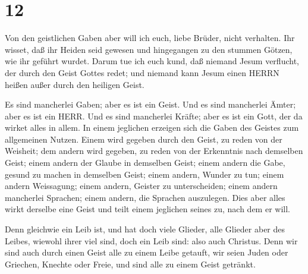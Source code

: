 \hypertarget{section-11}{%
\section{12}\label{section-11}}

 Von den geistlichen Gaben aber will ich euch, liebe Brüder,
nicht verhalten.  Ihr wisset, daß ihr Heiden seid gewesen
und hingegangen zu den stummen Götzen, wie ihr geführt wurdet.
 Darum tue ich euch kund, daß niemand Jesum verflucht, der
durch den Geist Gottes redet; und niemand kann Jesum einen HERRN heißen
außer durch den heiligen Geist.

 Es sind mancherlei Gaben; aber es ist ein Geist.
 Und es sind mancherlei Ämter; aber es ist ein HERR.
 Und es sind mancherlei Kräfte; aber es ist ein Gott, der da
wirket alles in allem.  In einem jeglichen erzeigen sich die
Gaben des Geistes zum allgemeinen Nutzen.  Einem wird
gegeben durch den Geist, zu reden von der Weisheit; dem andern wird
gegeben, zu reden von der Erkenntnis nach demselben Geist; 
einem andern der Glaube in demselben Geist; einem andern die Gabe,
gesund zu machen in demselben Geist;  einem andern, Wunder
zu tun; einem andern Weissagung; einem andern, Geister zu unterscheiden;
einem andern mancherlei Sprachen; einem andern, die Sprachen auszulegen.
 Dies aber alles wirkt derselbe eine Geist und teilt einem
jeglichen seines zu, nach dem er will.

 Denn gleichwie ein Leib ist, und hat doch viele Glieder,
alle Glieder aber des Leibes, wiewohl ihrer viel sind, doch ein Leib
sind: also auch Christus.  Denn wir sind auch durch einen
Geist alle zu einem Leibe getauft, wir seien Juden oder Griechen,
Knechte oder Freie, und sind alle zu einem Geist getränkt.

